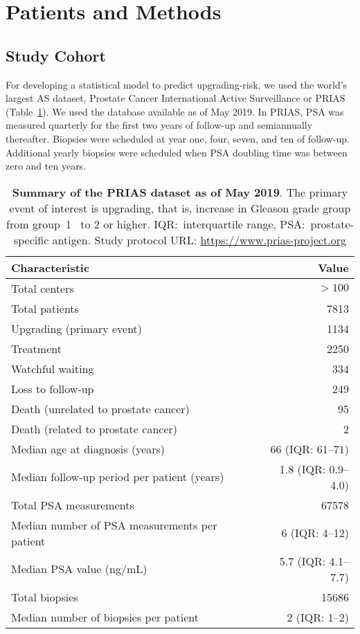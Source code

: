 \section{Patients and Methods}
\subsection{Study Cohort}
\label{subsec:cohort}
For developing a statistical model to predict upgrading-risk, we used the world's largest AS dataset, Prostate Cancer International Active Surveillance or PRIAS~\citep{bul2013active} (Table~\ref{table:prias_summary}). We used the database available as of May 2019. In PRIAS, PSA was measured quarterly for the first two years of follow-up and semiannually thereafter. Biopsies were scheduled at year one, four, seven, and ten of follow-up. Additional yearly biopsies were scheduled when PSA doubling time was between zero and ten years.

\begin{table}
\small\sf\centering
\caption{\textbf{Summary of the PRIAS dataset as of May 2019}. The primary event of interest is upgrading, that is, increase in Gleason grade group from group~1~\citep{epsteinGG2014} to 2 or higher. IQR:~interquartile range, PSA:~prostate-specific antigen. Study protocol URL: \url{https://www.prias-project.org}}
\label{table:prias_summary}
\begin{tabular}{lr}
\toprule
\textbf{Characteristic} & \textbf{Value}\\
\midrule
Total centers & $> 100$\\
Total patients & 7813\\
Upgrading (primary event) & 1134\\
Treatment & 2250\\
Watchful waiting & 334\\
Loss to follow-up & 249\\
Death (unrelated to prostate cancer) & 95\\
Death (related to prostate cancer) & 2\\
\midrule
Median age at diagnosis (years) & 66 (IQR: 61--71)\\
Median follow-up period per patient (years) &  1.8 (IQR: 0.9--4.0)\\
Total PSA measurements & 67578\\
Median number of PSA measurements per patient &  6 (IQR: 4--12)\\
Median PSA value (ng/mL) & 5.7 (IQR: 4.1--7.7)\\
Total biopsies & 15686\\
Median number of biopsies per patient &  2 (IQR: 1--2)\\
\bottomrule
\end{tabular}
\end{table}


